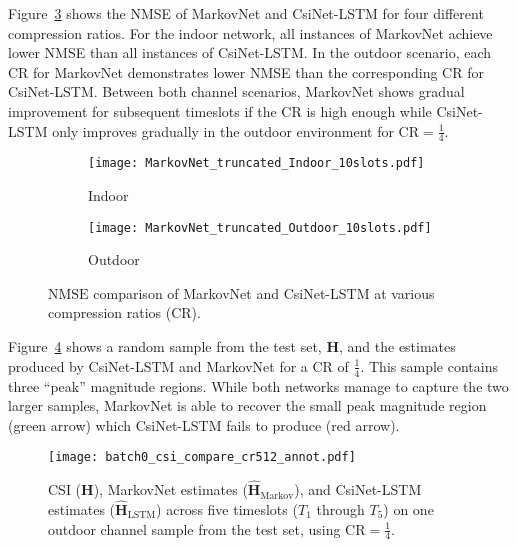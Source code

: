 Figure~\ref{fig:diffnet_result} shows the NMSE of MarkovNet and CsiNet-LSTM for four different compression ratios. For the indoor network, all instances of MarkovNet achieve lower NMSE than all instances of CsiNet-LSTM. In the outdoor scenario, each CR for MarkovNet demonstrates lower NMSE than the corresponding CR for CsiNet-LSTM. Between both channel scenarios, MarkovNet shows gradual improvement for subsequent timeslots if the CR is high enough while CsiNet-LSTM only improves gradually in the outdoor environment for CR$=\frac 14$.
\begin{figure}[!hbtp] \centering 
	\begin{subfigure}[t]{.45\textwidth}
		\centering
		\texttt{[image: MarkovNet\_truncated\_Indoor\_10slots.pdf]}
		\caption{Indoor}
		\label{fig:diffnet_indoor} 
	\end{subfigure}
	\begin{subfigure}[t]{.45\textwidth}
		\centering
		\texttt{[image: MarkovNet\_truncated\_Outdoor\_10slots.pdf]}
		\caption{Outdoor}
		\label{fig:diffnet_outdoor} 
	\end{subfigure}
	\caption{$\text{NMSE}$ comparison of MarkovNet and CsiNet-LSTM 
	at various compression ratios (CR).} 
	\label{fig:diffnet_result} \vspace*{-2mm}
\end{figure}  
Figure~\ref{fig:csi_image} shows a random sample from the test set, $\mathbf H$, and the estimates produced by CsiNet-LSTM and MarkovNet for a CR of $\frac 14$. This sample contains three ``peak'' magnitude regions. While both networks manage to capture the two larger samples, MarkovNet is able to recover the small peak magnitude region ({\color{darkgreen}green arrow}) which CsiNet-LSTM fails to produce ({\color{red}red arrow}).

\begin{figure}[htb] \centering 
	\texttt{[image: batch0\_csi\_compare\_cr512\_annot.pdf]}
	\caption{CSI ($\mathbf H$), MarkovNet estimates ($\hat{\mathbf H}_{\text{Markov}}$), and CsiNet-LSTM estimates ($\hat{\mathbf H}_{\text{LSTM}}$) across five timeslots ($T_1$ through $T_5$) on one outdoor channel sample from the test set,
using $\text{CR}=\frac 14$.} 
	\label{fig:csi_image} 
\end{figure}

